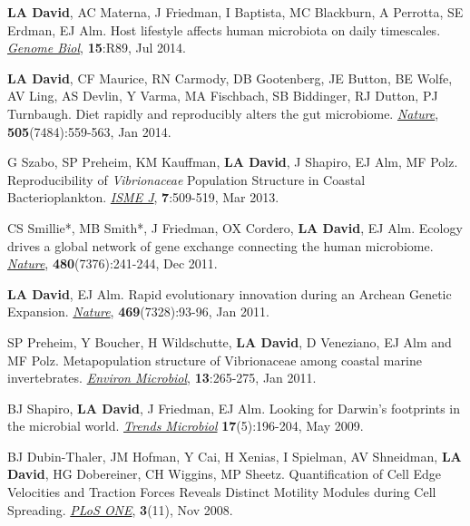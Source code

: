 \documentclass[overlapped,line,11pt]{res}
\begin{document}
\begin{resume}
\begin{revnumerate}[19]
\item {\textbf{LA David}, AC Materna, J Friedman, I Baptista, MC
  Blackburn, A Perrotta, SE Erdman, EJ Alm.  Host lifestyle affects
  human microbiota on daily timescales.
  \emph{\underline{Genome Biol}}, \textbf{15}:R89, Jul 2014.}

\item {\textbf{LA David}, CF Maurice, RN Carmody, DB Gootenberg, JE
  Button, BE Wolfe, AV Ling, AS Devlin, Y Varma, MA Fischbach, SB
  Biddinger, RJ Dutton, PJ Turnbaugh.  Diet rapidly and reproducibly
  alters the gut microbiome. \emph{\underline{Nature}},
  \textbf{505}(7484):559-563, Jan 2014.}

\item {G Szabo, SP Preheim, KM Kauffman, \textbf{LA David}, J Shapiro,
  EJ Alm, MF Polz.  Reproducibility of \emph{Vibrionaceae} Population
  Structure in Coastal Bacterioplankton. \emph{\underline{ISME J}},
  \textbf{7}:509-519, Mar 2013.}

\item {CS Smillie*, MB Smith*, J Friedman, OX Cordero, \textbf{LA
    David}, EJ Alm.  Ecology drives a global network of gene exchange
  connecting the human microbiome. \emph{\underline{Nature}},
  \textbf{480}(7376):241-244, Dec 2011.}

\item {\textbf{LA David}, EJ Alm.  Rapid evolutionary innovation during
  an Archean Genetic Expansion.  \emph{\underline{Nature}},
  \textbf{469}(7328):93-96, Jan 2011.}

\vspace*{1mm}
\item {SP Preheim, Y Boucher, H Wildschutte, \textbf{LA David},
  D Veneziano, EJ Alm and MF Polz.  Metapopulation
  structure of Vibrionaceae among coastal marine
  invertebrates. \emph{\underline{Environ Microbiol}}, \textbf{13}:265-275, Jan 2011.} 

\vspace*{1mm}
\item {BJ Shapiro, \textbf{LA David}, J Friedman, EJ Alm. Looking for
Darwin's footprints in the microbial world.  \emph{\underline{Trends Microbiol}}
\textbf{17}(5):196-204, May 2009.}

\vspace*{1mm}
\item { BJ Dubin-Thaler, JM Hofman, Y Cai, H Xenias, I Spielman, AV
  Shneidman, \textbf{LA David}, HG Dobereiner, CH Wiggins, MP Sheetz.
  Quantification of Cell Edge Velocities and Traction Forces Reveals
  Distinct Motility Modules during Cell Spreading. \emph{\underline{PLoS ONE}},
  \textbf{3}(11), Nov 2008.}


\end{revnumerate}
\end{resume}
\end{document}
